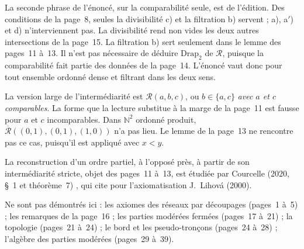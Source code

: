 \begin{remarque}
La seconde phrase de l'énoncé, sur la comparabilité seule, est de l'édition. Des conditions de la page~8, seules la divisibilité c) et la filtration b) servent ; a), a$'$) et d) n'interviennent pas. La divisibilité rend non vides les deux autres intersections de la page~15. La filtration b) sert seulement dans le lemme des pages~11 à~13. Il n'est pas nécessaire de déduire $\mathrm{Drap}_2$ de $\mathcal R$, puisque la comparabilité fait partie des données de la page~14. L'énoncé vaut donc pour tout ensemble ordonné dense et filtrant dans les deux sens.
\end{remarque}

\begin{remarque}
La version large de l'intermédiarité est $\mathcal R(a,b,c)$, ou $b \in \{a,c\}$ \emph{avec $a$ et $c$ comparables}. La forme  que la lecture substitue à la marge de la page~11 est fausse pour $a$ et $c$ incomparables. Dans $\mathbb N^2$ ordonné produit, $\overline{\mathcal R}((0,1),(0,1),(1,0))$ n'a pas lieu. Le lemme de la page~13 ne rencontre pas ce cas, puisqu'il est appliqué avec $x < y$.
\end{remarque}

\begin{remarque}
La reconstruction d'un ordre partiel, à l'opposé près, à partir de son intermédiarité stricte, objet des pages~11 à~13, est étudiée par Courcelle (2020, §~1 et théorème~7) \cite{courcelle2020}, qui cite pour l'axiomatisation J.~Lihová (2000).
\end{remarque}

Ne sont pas démontrés ici : les axiomes des réseaux par découpages (pages~1 à~5) ; les remarques de la page~16 ; les parties modérées fermées (pages~17 à~21) ; la topologie (pages~21 à~24) ; le bord et les pseudo-tronçons (pages~24 à~28) ; l'algèbre des parties modérées (pages~29 à~39).
